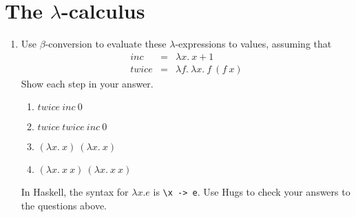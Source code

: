 \documentclass{article}
\begin{document}
\section{The $\lambda$-calculus}
\begin{enumerate}
\item Use $\beta$-conversion to evaluate these $\lambda$-expressions
  to values, assuming that 
\begin{eqnarray*}
\mathit{inc}&=&\lambda x.~x+1\\
\mathit{twice}&=&\lambda f.~\lambda x.~f~(f~x)
\end{eqnarray*}
Show each step in your answer.
\begin{enumerate}
\item $\mathit{twice}~\mathit{inc}~0$ 
\item $\mathit{twice}~\mathit{twice}~\mathit{inc}~0$ 
\item $(\lambda x.~x)~(\lambda x.~x)$ 
\item $(\lambda x.~x~x)~(\lambda x.~x~x)$ 
\end{enumerate}
In Haskell, the syntax for $\lambda x.e$ is \verb!\x -> e!. Use Hugs
to check your answers to the questions above.


\end{enumerate}
\end{document}
